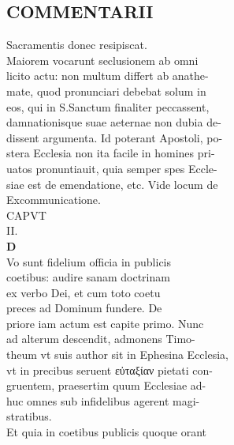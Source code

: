 \documentclass{article}
\begin{document}
\begin{pages}
\section*{COMMENTARII \\
                }Sacramentis donec resipiscat. \\
                Maiorem vocarunt seclusionem ab omni \\
                licito actu: non multum differt ab anathe- \\
                mate, quod pronunciari debebat solum in \\
                eos, qui in S.Sanctum finaliter peccassent, \\
                damnationisque suae aeternae non dubia de- \\
                dissent argumenta. Id poterant Apostoli, po- \\
                stera Ecclesia non ita facile in homines pri- \\
                uatos pronuntiauit, quia semper spes Eccle- \\
                siae est de emendatione, etc. Vide locum de \\
                Excommunicatione. \\
                CAPVT \\
                II. \\
                
\textbf{D \\
                }Vo sunt fidelium officia in publicis \\
                coetibus: audire sanam doctrinam \\
                ex verbo Dei, et cum toto coetu \\
                preces ad Dominum fundere. De \\
                priore iam actum est capite primo. Nunc \\
                ad alterum descendit, admonens Timo- \\
                theum vt suis author sit in Ephesina Ecclesia, \\
                vt in precibus seruent εὐταξίαν pietati con- \\
                gruentem, praesertim quum Ecclesiae ad- \\
                huc omnes sub infidelibus agerent magi- \\
                stratibus. \\
                Et quia in coetibus publicis quoque orant \\
                

\end{pages}
\end{document}

